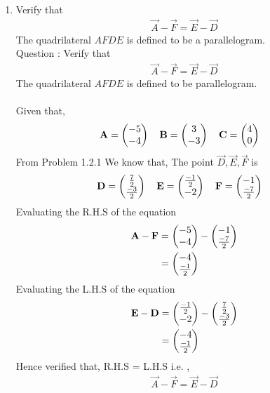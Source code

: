 \documentclass[10pt]{book}
\begin{document}
\begin{enumerate}[label=\thesection.\arabic*.,ref=\thesection.\theenumi]
\item Verify that 
		\begin{align}
\vec{A}-\vec{F}=\vec{E}-\vec{D}
		\end{align}
The quadrilateral $AFDE$ is defined to be a parallelogram.\\
Question : Verify that 
\begin{align}
	\vec{A}-\vec{F} = \vec{E}-\vec{D}
\end{align}
The quadrilateral $AFDE$ is defined to be parallelogram.\\ 
\solution \\
Given that,
\begin{align}
    \mathbf{A} = \begin{pmatrix}-5\\-4\end{pmatrix}
    \quad
    \mathbf{B} &= \begin{pmatrix}3\\-3\end{pmatrix}
    \quad
    \mathbf{C} = \begin{pmatrix}4\\ 0\end{pmatrix}
\end{align}
From Problem 1.2.1 We know that, The point $\vec{D},\vec{E},\vec{F}$ is 
\begin{align}
    \mathbf{D} = \begin{pmatrix}\frac{7}{2}\\ \frac{-3}{2} \end{pmatrix}
    \quad
    \mathbf{E} &= \begin{pmatrix}\frac{-1}{2}\\-2\end{pmatrix}
    \quad
    \mathbf{F} = \begin{pmatrix}-1 \\ \frac{-7}{2}\end{pmatrix}
\end{align}
Evaluating the R.H.S of the equation
\begin{align}
    \mathbf{A}-\mathbf{F}&=\begin{pmatrix}-5\\-4\end{pmatrix} - \begin{pmatrix}-1\\ \frac{-7}{2} \end{pmatrix}\\
    &=\begin{pmatrix} -4 \\ \frac{-1}{2} \end{pmatrix}
\end{align} 
Evaluating the L.H.S of the equation
\begin{align}
    \mathbf{E}-\mathbf{D}&=\begin{pmatrix}\frac{-1}{2}\\-2\end{pmatrix}-\begin{pmatrix}\frac{7}{2}\\ \frac{-3}{2} \end{pmatrix}\\
    &=\begin{pmatrix}-4 \\ \frac{-1}{2} \end{pmatrix}
\end{align}	
Hence verified that, R.H.S = L.H.S i.e. ,
\begin{align}
	\vec{A}-\vec{F} = \vec{E}-\vec{D}
\end{align}


\end{enumerate}
\end{document}
